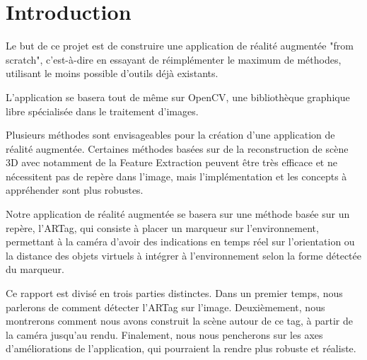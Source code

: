 \part*{Introduction}

Le but de ce projet est de construire une application de réalité augmentée "from scratch", c'est-à-dire en essayant de réimplémenter le maximum de méthodes, utilisant le moins possible d'outils déjà existants.

L'application se basera tout de même sur OpenCV, une bibliothèque graphique libre spécialisée dans le traitement d'images.

Plusieurs méthodes sont envisageables pour la création d'une application de réalité augmentée. Certaines méthodes basées sur de la reconstruction de scène 3D avec notamment de la Feature Extraction peuvent être très efficace et ne nécessitent pas de repère dans l'image, mais l'implémentation et les concepts à appréhender sont plus robustes.

Notre application de réalité augmentée se basera sur une méthode basée sur un repère, l'ARTag, qui consiste à placer un marqueur sur l'environnement, permettant à la caméra d'avoir des indications en temps réel sur l'orientation ou la distance des objets virtuels à intégrer à l'environnement selon la forme détectée du marqueur. 

Ce rapport est divisé en trois parties distinctes. Dans un premier temps, nous parlerons de comment détecter l'ARTag sur l'image. Deuxièmement, nous montrerons comment nous avons construit la scène autour de ce tag, à partir de la caméra jusqu'au rendu. Finalement, nous nous pencherons sur les axes d'améliorations de l'application, qui pourraient la rendre plus robuste et réaliste.

